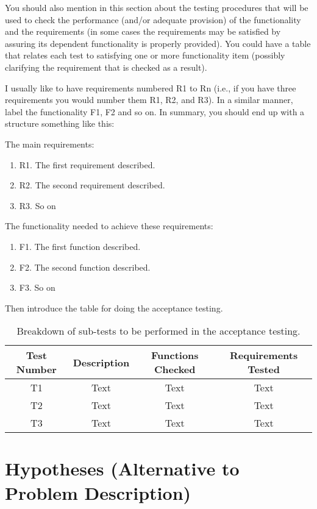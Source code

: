 You should also mention in this section about the testing procedures that will be used to check the performance (and/or adequate provision) of the functionality and the requirements (in some cases the requirements may be satisfied by assuring its dependent functionality is properly provided). You could have a table that relates each test to satisfying one or more functionality item (possibly clarifying the requirement that is checked as a result).

I usually like to have requirements numbered R1 to Rn (i.e., if you have three requirements you would number them R1, R2, and R3). In a similar manner, label the functionality F1, F2 and so on.
In summary, you should end up with a structure something like this:

The main requirements:

\begin{enumerate}
	\item R1. The first requirement described.
	\item R2. The second requirement described.
	\item R3. So on
\end{enumerate}

The functionality needed to achieve these requirements:

\begin{enumerate}
	\item F1. The first function described.
	\item F2. The second function described.
	\item F3. So on
\end{enumerate}

Then introduce the table for doing the acceptance testing.

\begin{table}[ht]
	\centering
\begin{tabular}{|c|c|c|c|}
	\hline 
	Test Number & Description & Functions Checked & Requirements Tested \\ 
	\hline 
	T1 & Text & Text & Text \\
	\hline 
	T2 & Text & Text & Text \\
	\hline 
	T3 & Text & Text & Text \\ 
	\hline 
\end{tabular}
    \caption{\label{tab:table-name}Breakdown of sub-tests to be performed in the acceptance testing.}
\end{table}

\section{Hypotheses (Alternative to Problem Description)}

